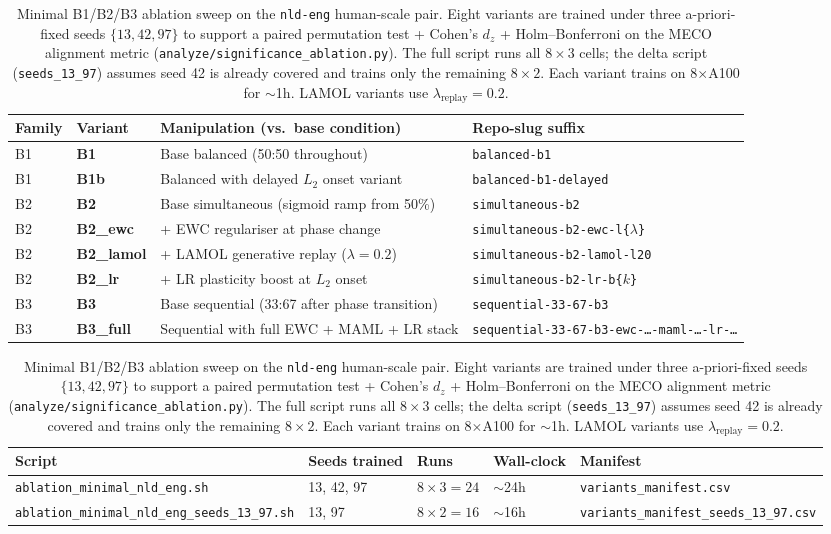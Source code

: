\begin{table}[t]
\centering
\small
\caption{Minimal B1/B2/B3 ablation sweep on the \texttt{nld-eng} human-scale
pair. Eight variants are trained under three a-priori-fixed seeds
$\{13, 42, 97\}$ to support a paired permutation test + Cohen's $d_z$ +
Holm--Bonferroni on the MECO alignment metric
(\texttt{analyze/significance\_ablation.py}). The full script runs all $8\times3$
cells; the delta script (\texttt{seeds\_13\_97}) assumes seed 42 is already
covered and trains only the remaining $8\times2$. Each variant trains on
8$\times$A100 for $\sim$1h. LAMOL variants use $\lambda_{\text{replay}}=0.2$.}
\label{tab:ablation-sweep}
\begin{tabular}{@{}l l l l@{}}
\toprule
Family & Variant & Manipulation (vs.\ base condition)                     & Repo-slug suffix \\
\midrule
B1 & \textbf{B1}        & Base balanced (50:50 throughout)                     & \texttt{balanced-b1} \\
B1 & \textbf{B1b}       & Balanced with delayed $L_2$ onset variant            & \texttt{balanced-b1-delayed} \\
\midrule
B2 & \textbf{B2}        & Base simultaneous (sigmoid ramp from 50\%)           & \texttt{simultaneous-b2} \\
B2 & \textbf{B2\_ewc}   & + EWC regulariser at phase change                    & \texttt{simultaneous-b2-ewc-l\{$\lambda$\}} \\
B2 & \textbf{B2\_lamol} & + LAMOL generative replay ($\lambda=0.2$)            & \texttt{simultaneous-b2-lamol-l20} \\
B2 & \textbf{B2\_lr}    & + LR plasticity boost at $L_2$ onset                 & \texttt{simultaneous-b2-lr-b\{$k$\}} \\
\midrule
B3 & \textbf{B3}        & Base sequential (33:67 after phase transition)       & \texttt{sequential-33-67-b3} \\
B3 & \textbf{B3\_full}  & Sequential with full EWC + MAML + LR stack           & \texttt{sequential-33-67-b3-ewc-\ldots-maml-\ldots-lr-\ldots} \\
\bottomrule
\end{tabular}

\vspace{0.5em}
\begin{tabular}{@{}l l l l l@{}}
\toprule
Script & Seeds trained & Runs & Wall-clock & Manifest \\
\midrule
\texttt{ablation\_minimal\_nld\_eng.sh}           & 13, 42, 97 & $8\times 3 = 24$ & $\sim$24h & \texttt{variants\_manifest.csv} \\
\texttt{ablation\_minimal\_nld\_eng\_seeds\_13\_97.sh} & 13, 97     & $8\times 2 = 16$ & $\sim$16h & \texttt{variants\_manifest\_seeds\_13\_97.csv} \\
\bottomrule
\end{tabular}
\end{table}

